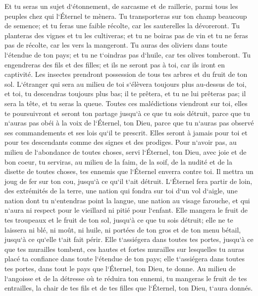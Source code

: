 \verse Et tu seras un sujet d`étonnement, de sarcasme et de raillerie, parmi tous les peuples chez qui l`Éternel te mènera. 
\verse Tu transporteras sur ton champ beaucoup de semence; et tu feras une faible récolte, car les sauterelles la dévoreront. 
\verse Tu planteras des vignes et tu les cultiveras; et tu ne boiras pas de vin et tu ne feras pas de récolte, car les vers la mangeront. 
\verse Tu auras des oliviers dans toute l`étendue de ton pays; et tu ne t`oindras pas d`huile, car tes olives tomberont. 
\verse Tu engendreras des fils et des filles; et ils ne seront pas à toi, car ils iront en captivité. 
\verse Les insectes prendront possession de tous tes arbres et du fruit de ton sol. 
\verse L`étranger qui sera au milieu de toi s`élèvera toujours plus au-dessus de toi, et toi, tu descendras toujours plus bas; 
\verse il te prêtera, et tu ne lui prêteras pas; il sera la tête, et tu seras la queue. 
\verse Toutes ces malédictions viendront sur toi, elles te poursuivront et seront ton partage jusqu`à ce que tu sois détruit, parce que tu n`auras pas obéi à la voix de l`Éternel, ton Dieu, parce que tu n`auras pas observé ses commandements et ses lois qu`il te prescrit. 
\verse Elles seront à jamais pour toi et pour tes descendants comme des signes et des prodiges. 
\verse Pour n`avoir pas, au milieu de l`abondance de toutes choses, servi l`Éternel, ton Dieu, avec joie et de bon coeur, 
\verse tu serviras, au milieu de la faim, de la soif, de la nudité et de la disette de toutes choses, tes ennemis que l`Éternel enverra contre toi. Il mettra un joug de fer sur ton cou, jusqu`à ce qu`il t`ait détruit. 
\verse L`Éternel fera partir de loin, des extrémités de la terre, une nation qui fondra sur toi d`un vol d`aigle, une nation dont tu n`entendras point la langue, 
\verse une nation au visage farouche, et qui n`aura ni respect pour le vieillard ni pitié pour l`enfant. 
\verse Elle mangera le fruit de tes troupeaux et le fruit de ton sol, jusqu`à ce que tu sois détruit; elle ne te laissera ni blé, ni moût, ni huile, ni portées de ton gros et de ton menu bétail, jusqu`à ce qu`elle t`ait fait périr. 
\verse Elle t`assiégera dans toutes tes portes, jusqu`à ce que tes murailles tombent, ces hautes et fortes murailles sur lesquelles tu auras placé ta confiance dans toute l`étendue de ton pays; elle t`assiégera dans toutes tes portes, dans tout le pays que l`Éternel, ton Dieu, te donne. 
\verse Au milieu de l`angoisse et de la détresse où te réduira ton ennemi, tu mangeras le fruit de tes entrailles, la chair de tes fils et de tes filles que l`Éternel, ton Dieu, t`aura donnés. 
